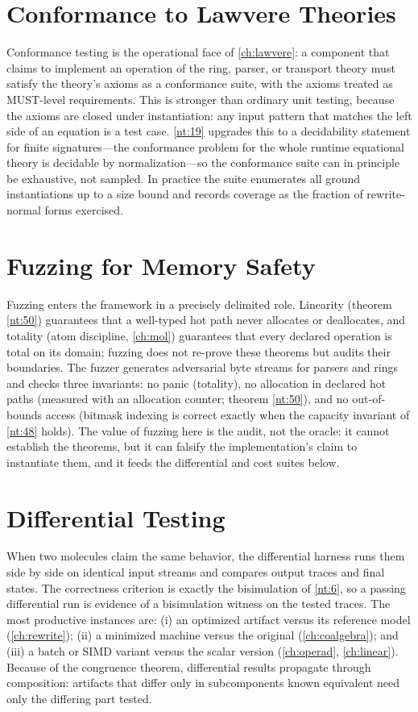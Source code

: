 \section{Conformance to Lawvere Theories}
Conformance testing is the operational face of \autoref{ch:lawvere}: a component that claims to implement an operation of the ring, parser, or transport theory must satisfy the theory's axioms as a conformance suite, with the axioms treated as MUST-level requirements. This is stronger than ordinary unit testing, because the axioms are closed under instantiation: any input pattern that matches the left side of an equation is a test case. \ref{nt:19} upgrades this to a decidability statement for finite signatures---the conformance problem for the whole runtime equational theory is decidable by normalization---so the conformance suite can in principle be exhaustive, not sampled. In practice the suite enumerates all ground instantiations up to a size bound and records coverage as the fraction of rewrite-normal forms exercised.

\section{Fuzzing for Memory Safety}
Fuzzing enters the framework in a precisely delimited role. Linearity (theorem \ref{nt:50}) guarantees that a well-typed hot path never allocates or deallocates, and totality (atom discipline, \autoref{ch:mol}) guarantees that every declared operation is total on its domain; fuzzing does not re-prove these theorems but audits their boundaries. The fuzzer generates adversarial byte streams for parsers and rings and checks three invariants: no panic (totality), no allocation in declared hot paths (measured with an allocation counter; theorem \ref{nt:50}), and no out-of-bounds access (bitmask indexing is correct exactly when the capacity invariant of \ref{nt:48} holds). The value of fuzzing here is the audit, not the oracle: it cannot establish the theorems, but it can falsify the implementation's claim to instantiate them, and it feeds the differential and cost suites below.

\section{Differential Testing}
When two molecules claim the same behavior, the differential harness runs them side by side on identical input streams and compares output traces and final states. The correctness criterion is exactly the bisimulation of \ref{nt:6}, so a passing differential run is evidence of a bisimulation witness on the tested traces. The most productive instances are: (i) an optimized artifact versus its reference model (\autoref{ch:rewrite}); (ii) a minimized machine versus the original (\autoref{ch:coalgebra}); and (iii) a batch or SIMD variant versus the scalar version (\autoref{ch:operad}, \autoref{ch:linear}). Because of the congruence theorem, differential results propagate through composition: artifacts that differ only in subcomponents known equivalent need only the differing part tested.

